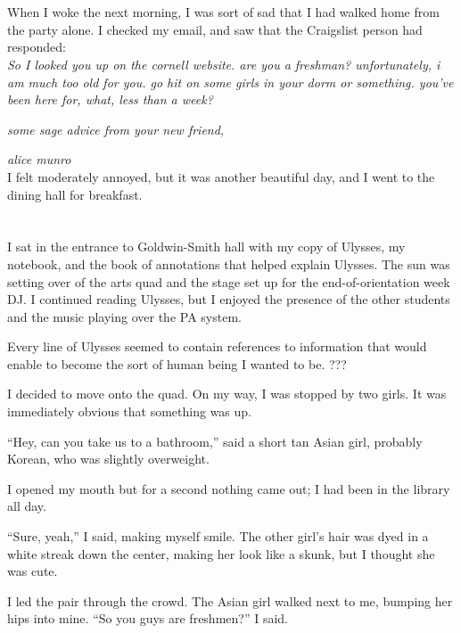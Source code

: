 \section{}

When I woke the next morning, I was sort of sad that I had walked home from the
party alone.  I checked my email, and saw that the Craigslist person had
responded: \\

\textit{
So I looked you up on the cornell website. are you a freshman? unfortunately, i
am much too old for you. go hit on some girls in your dorm or something. you've
been here for, what, less than a week?}

\textit{some sage advice from your new friend,}

\textit{alice munro}\\

I felt moderately annoyed, but it was another beautiful day, and I went to the
dining hall for breakfast.

\section{}

I sat in the entrance to Goldwin-Smith hall with my copy of Ulysses, my
notebook, and the book of annotations that helped explain Ulysses.  The sun was
setting over of the arts quad and the stage set up for the end-of-orientation
week DJ. I continued reading Ulysses, but I enjoyed the presence of the other
students and the music playing over the PA system.

Every line of Ulysses seemed to contain references to information that would
enable to become the sort of human being I wanted to be.  ???

I decided to move onto the quad.  On my way, I was stopped by two girls.  It was
immediately obvious that something was up.

``Hey, can you take us to a bathroom,'' said a short tan Asian girl, probably
Korean, who was slightly overweight.

I opened my mouth but for a second nothing came out; I had been in the library
all day.

``Sure, yeah,'' I said, making myself smile.  The other girl's hair was dyed in
a white streak down the center, making her look like a skunk, but I thought  she
was cute.

I led the pair through the crowd.  The Asian girl walked next to me, bumping
her hips into mine. ``So you guys are freshmen?'' I said.  

